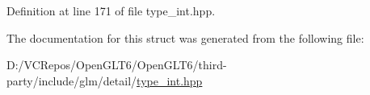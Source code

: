 Definition at line 171 of file type\+\_\+int.\+hpp.



The documentation for this struct was generated from the following file\+:\begin{DoxyCompactItemize}
\item 
D\+:/\+V\+C\+Repos/\+Open\+G\+L\+T6/\+Open\+G\+L\+T6/third-\/party/include/glm/detail/\mbox{\hyperlink{type__int_8hpp}{type\+\_\+int.\+hpp}}\end{DoxyCompactItemize}
